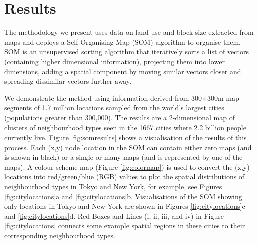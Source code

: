 \section{Results}

The methodology we present uses data on land use and block size extracted from maps and deploys a Self Organising Map (SOM) algorithm to organise them. SOM is an unsupervised sorting algorithm that iteratively sorts a list of vectors (containing higher dimensional information), projecting them into lower dimensions, adding a spatial component by moving similar vectors closer and spreading dissimilar vectors further away.

We demonstrate the method using information derived from 300$\times$300m map segments of 1.7 million locations sampled from the world's largest cities (populations greater than 300,000). The results are a 2-dimensional map of clusters of neighbourhood types seen in the 1667 cities where 2.2 billion people currently live. Figure \ref{fig:somresults} shows a visualisation of the results of this process. Each (x,y) node location in the SOM can contain either zero maps (and is shown in black) or a single or many maps (and is represented by one of the maps). A colour scheme map (Figure \ref{fig:colormap}) is used to convert the (x,y) locations into red/green/blue (RGB) values to plot the spatial distributions of neighbourhood types in Tokyo and New York, for example, see Figures \ref{fig:citylocations}a and \ref{fig:citylocations}b. Visualisations of the SOM showing only locations in Tokyo and New York are shown in Figures \ref{fig:citylocations}c and \ref{fig:citylocations}d. Red Boxes and Lines (i, ii, iii, and iv) in Figure \ref{fig:citylocations} connects some example spatial regions in these cities to their corresponding neighbourhood types.


